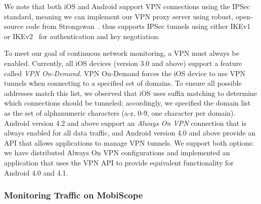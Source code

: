 We note that both iOS and Android support VPN connections 
using the IPSec standard, meaning we can implement our VPN proxy 
server using robust, open-source code from Strongswan~\cite{strongswan}. 
\platname{} thus supports IPSec tunnels using either IKEv1 or
IKEv2~\cite{rfc5996} for authentication and key negotiation.


To meet our goal of continuous network monitoring,
a VPN must always be enabled. Currently, all iOS devices (version 3.0
and above) support a feature called \textit{VPN On-Demand}.  VPN
On-Demand forces the iOS device to use VPN tunnels when connecting to
a specified set of domains. To ensure all possible addresses match this list, 
we observed that iOS uses suffix matching to determine which connections 
should be tunneled; accordingly, we specified the domain list as the set of 
alphanumeric characters (a-z, 0-9, one character per domain). 
Android version 4.2 and above support an
\textit{Always On VPN} connection that is always enabled for all data
traffic, and Android version 4.0 and above provide an API that allows
applications to manage VPN tunnels. We support both options: we have distributed Always On VPN 
configurations and implemented an application that
uses the VPN API to provide equivalent functionality for
Android 4.0 and 4.1.






\subsubsection{Monitoring Traffic on MobiScope}
\label{sec:monit-traff-mobiscope}



